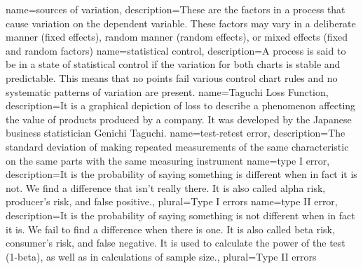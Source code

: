{
    name={sources of variation},
    description={These are the factors in a process that cause variation on the dependent variable. These factors may vary in a deliberate manner (fixed effects), random manner (random effects), or mixed effects (fixed and random factors)}
}
{
    name={statistical control},
    description={A process is said to be in a state of statistical control if the variation for both charts is stable and predictable. This means that no points fail various control chart rules and no systematic patterns of variation are present.}
}
{
    name={Taguchi Loss Function},
    description={It is a graphical depiction of loss to describe a phenomenon affecting the value of products produced by a company. It was developed by the Japanese business statistician Genichi Taguchi.}
}
{
    name={test-retest error},
    description={The standard deviation of making repeated measurements of the same characteristic on the same parts with the same measuring instrument}
}
{
    name={type I error},
    description={It is the probability of saying something is different when in fact it is not. We find a difference that isn’t really there. It is also called alpha risk, producer's risk, and false positive.},
    plural={Type I errors}
}
{
    name={type II error},
    description={It is the probability of saying something is not different when in fact it is. We fail to find a difference when there is one. It is also called beta risk, consumer’s risk, and false negative. It is used to calculate the power of the test (1-beta), as well as in calculations of sample size.},
    plural={Type II errors}
}
